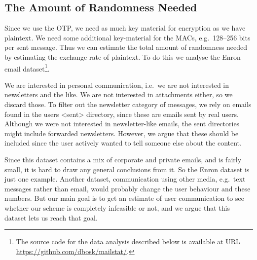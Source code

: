 \subsection{The Amount of Randomness Needed}
\label{sec:NeededRandomness}
Since we use the \ac{OTP}, we need as much key material for encryption as we 
have plaintext.
We need some additional key-material for the \acp{MAC}, e.g.~128--256 bits 
per sent message.
Thus we can estimate the total amount of randomness needed by estimating the 
exchange rate of plaintext.
To do this we analyse the Enron email dataset\footnote{%
  The source code for the data analysis described below is available at URL 
  \url{https://github.com/dbosk/mailstat/}.
}.

We are interested in personal communication, i.e.~we are not interested in 
newsletters and the like.
We are not interested in attachments either, so we discard those.
To filter out the newsletter category of messages, we rely on emails found in 
the users <sent> directory, since these are emails sent by real users.
Although we were not interested in newsletter-like emails, the sent directories 
might include forwarded newsletters.
However, we argue that these should be included since the user actively wanted 
to tell someone else about the content.


Since this dataset contains a mix of corporate and private emails, and is 
fairly small, it is hard to draw any general conclusions from it.
So the Enron dataset is just one example.
Another dataset, communication using other media, e.g.~text messages rather 
than email, would probably change the user behaviour and these numbers.
But our main goal is to get an estimate of user communication to see whether 
our scheme is completely infeasible or not, and we argue that this dataset lets 
us reach that goal.

